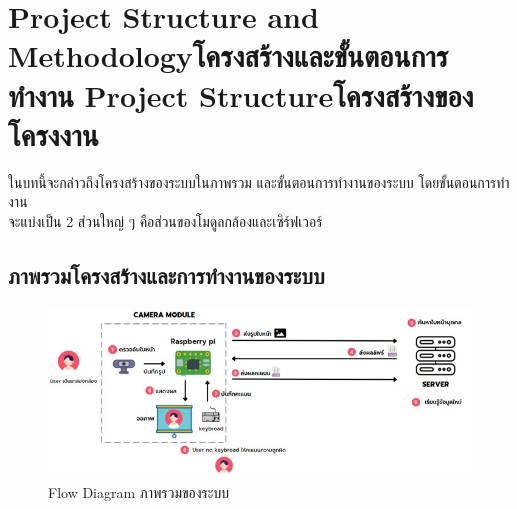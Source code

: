 \chapter{\ifproject%
\ifenglish Project Structure and Methodology\else โครงสร้างและขั้นตอนการทำงาน\fi
\else%
\ifenglish Project Structure\else โครงสร้างของโครงงาน\fi
\fi
}

ในบทนี้จะกล่าวถึงโครงสร้างของระบบในภาพรวม และขั้นตอนการทํางานของระบบ โดยขั้นตอนการทํางาน \\
จะแบ่งเป็น 2 ส่วนใหญ่ ๆ คือส่วนของโมดูลกล้องและเซิร์ฟเวอร์

\makeatletter


\makeatother

\section{ภาพรวมโครงสร้างและการทำงานของระบบ}


\begin{figure}[h]
  \begin{center}
    \includegraphics{pic/overview.jpg}
  \caption[Poem]{Flow Diagram ภาพรวมของระบบ}
  \end{center}
  \label{fig:overview}
\end{figure}

